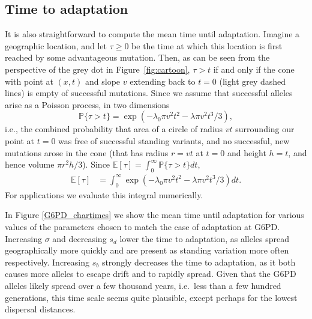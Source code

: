 \documentclass{article}
\renewcommand{\P}{\mathbb{P}}
\newcommand{\E}{\mathbb{E}}
\begin{document}
\subsection{Time to adaptation}

It is also straightforward to compute the mean time until adaptation.
Imagine a geographic location, and let $\tau \ge 0$ be the time at
which this location is first reached by some advantageous mutation.
Then, as can be seen from the
perspective of the grey dot in Figure~\ref{fig:cartoon}, 
$\tau > t$ if and only if the cone with point at $(x,t)$ and slope $v$
extending back to $t=0$ (light grey dashed lines) is empty of
successful mutations. Since we assume that successful alleles arise as a Poisson process, 
in two dimensions
\begin{equation} \label{eqn-no-mut-t}
    \P\{ \tau > t \} = \exp\left( - \lambda_0 \pi v^2 t^2 - \lambda \pi v^2 t^3 / 3 \right) ,
\end{equation}
i.e., the combined probability that area of a circle of radius $vt$ surrounding our
point at $t=0$ was free of successful standing variants, and no
successful, new mutations arose in the cone (that has radius $r=vt$ at
$t=0$ and height $h=t$, and hence volume $\pi r^2 h/3$). 
Since $\E[\tau] = \int_0^\infty \P\{ \tau > t \} dt$,
\begin{align}
    \E[\tau] %
        &= \int_0^\infty \exp\left( - \lambda_0 \pi v^2 t^2 - \lambda \pi v^2 t^3 / 3 \right) dt.
\end{align}
For applications we evaluate this integral numerically.   %


In Figure \ref{G6PD_chartimes} we show the mean time until adaptation
for various values of the parameters chosen to match the case of
adaptation at G6PD. Increasing $\sigma$ and decreasing $s_d$ lower 
the time to adaptation, as alleles spread geographically more quickly
and are present as standing variation more often
respectively. Increasing $s_b$ strongly decreases the time to
adaptation, as it both causes more alleles to escape drift and to
rapidly spread. Given that the G6PD alleles likely spread over a few
thousand years, i.e.\ less than a few hundred generations, 
this time scale seems quite plausible, except perhaps for the lowest dispersal distances.  
\end{document}
